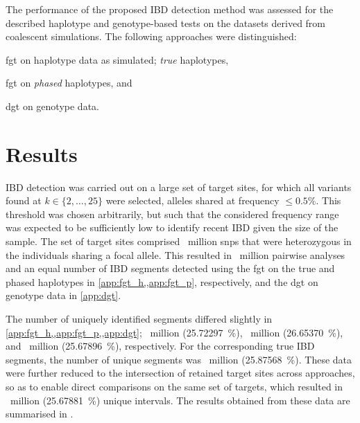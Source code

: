 The performance of the proposed IBD detection method was assessed for the described haplotype and genotype-based tests on the  datasets derived from coalescent simulations.
The following approaches were distinguished:
\begin{approach}\setlength\itemsep{0em}
\item\label{app:fgt_h} \gls{fgt} on haplotype data as simulated; \ie \emph{true} haplotypes,
\item\label{app:fgt_p} \gls{fgt} on \emph{phased} haplotypes, and
\item\label{app:dgt} \gls{dgt} on genotype data.
\end{approach}


%
\section{Results}\label{sec:ibd_results}
%

IBD detection was carried out on a large set of target sites, for which all \fk{} variants found at ${k \in \lbrace 2, \ldots, 25 \rbrace}$ were selected, \ie alleles shared at frequency ${\leq 0.5\%}$.
This threshold was chosen arbitrarily, but such that the considered frequency range was expected to be sufficiently low to identify recent IBD given the size of the sample.
The set of target sites comprised ~million \glspl{snp} that were heterozygous in the individuals sharing a focal allele.
This resulted in ~million pairwise analyses and an equal number of IBD segments detected using the \gls{fgt} on the true and phased haplotypes in \cref{app:fgt_h,,app:fgt_p}, respectively, and the \gls{dgt} on genotype data in \cref{app:dgt}.


The number of uniquely identified segments differed slightly in \cref{app:fgt_h,,app:fgt_p,,app:dgt};
~million (\SI{25.72297}{\percent}),
~million (\SI{26.65370}{\percent}), and
~million (\SI{25.67896}{\percent}), respectively.
For the corresponding true IBD segments, the number of unique segments was ~million (\SI{25.87568}{\percent}).
These data were further reduced to the intersection of retained target sites across approaches, so as to enable direct comparisons on the same set of targets, which resulted in ~million (\SI{25.67881}{\percent}) unique intervals.
The results obtained from these data are summarised in .

%

%

